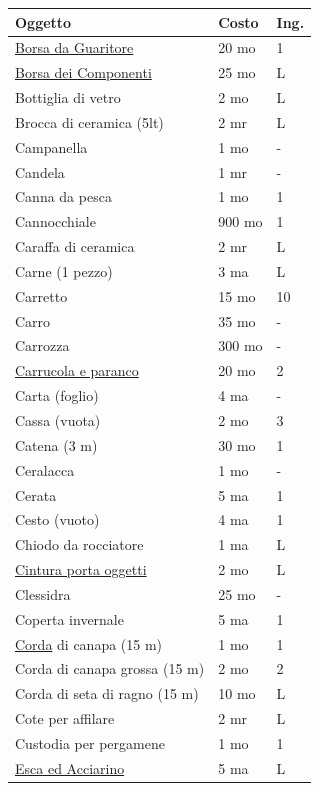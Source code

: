 \begin{multicols}{2}
\columnbreak

\noindent
\noindent\begin{tabular}{p{5cm}p{1.5cm}p{0.7cm}}
\toprule
\textbf{Oggetto} & \textbf{Costo} & \textbf{Ing.} \\
\midrule

\hyperlink{borsadaguaritore}{Borsa da Guaritore} & 20 mo & 1 \\
\hyperlink{Borsa dei Componenti}{Borsa dei Componenti} & 25 mo & L \\
Bottiglia di vetro & 2 mo & L \\
Brocca di ceramica (5lt) & 2 mr & L \\
Campanella & 1 mo & - \\
Candela & 1 mr & - \\
Canna da pesca & 1 mo & 1 \\
Cannocchiale & 900 mo & 1 \\
Caraffa di ceramica & 2 mr & L \\
Carne (1 pezzo) & 3 ma & L \\
Carretto & 15 mo & 10 \\
Carro & 35 mo & - \\
Carrozza & 300 mo & - \\
\hyperlink{Carrucola e paranco}{Carrucola e paranco} & 20 mo & 2 \\
Carta (foglio) & 4 ma & - \\
Cassa (vuota) & 2 mo & 3 \\
Catena (3 m) & 30 mo & 1 \\
Ceralacca & 1 mo & - \\
Cerata & 5 ma & 1 \\
Cesto (vuoto) & 4 ma & 1 \\
Chiodo da rocciatore & 1 ma & L \\
\hyperlink{Cintura porta oggetti}{Cintura porta oggetti} & 2 mo & L \\
Clessidra & 25 mo & - \\
Coperta invernale & 5 ma & 1 \\
\hyperlink{Corda}{Corda} di canapa (15 m) & 1 mo & 1 \\
Corda di canapa grossa (15 m) & 2 mo & 2 \\
Corda di seta di ragno (15 m) & 10 mo & L \\
Cote per affilare & 2 mr & L \\
Custodia per pergamene & 1 mo & 1 \\
\hyperlink{Esca ed Acciarino}{Esca ed Acciarino} & 5 ma & L \\

\end{tabular}
\end{multicols}
